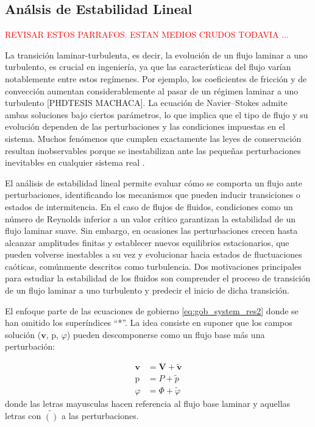 \subsection{Análsis de Estabilidad Lineal}

\textcolor{red}{REVISAR ESTOS PARRAFOS. ESTAN MEDIOS CRUDOS TODAVIA ...}

La transición laminar-turbulenta, es decir, la evolución de un flujo laminar a uno turbulento, es crucial en ingeniería, ya que las características del flujo varían notablemente entre estos regímenes. Por ejemplo, los coeficientes de fricción y de convección aumentan considerablemente al pasar de un régimen laminar a uno turbulento [PHDTESIS MACHACA]. La ecuación de Navier–Stokes admite ambas soluciones bajo ciertos parámetros, lo que implica que el tipo de flujo y su evolución dependen de las perturbaciones y las condiciones impuestas en el sistema. Muchos fenómenos que cumplen exactamente las leyes de conservación resultan inobservables porque se inestabilizan ante las pequeñas perturbaciones inevitables en cualquier sistema real \cite{kundu}.

El análisis de estabilidad lineal permite evaluar cómo se comporta un flujo ante perturbaciones, identificando los mecanismos que pueden inducir transiciones o estados de intermitencia. En el caso de flujos de fluidos, condiciones como un número de Reynolds inferior a un valor crítico garantizan la estabilidad de un flujo laminar suave. Sin embargo, en ocasiones las perturbaciones crecen hasta alcanzar amplitudes finitas y establecer nuevos equilibrios estacionarios, que pueden volverse inestables a su vez y evolucionar hacia estados de fluctuaciones caóticas, comúnmente descritos como turbulencia. Dos motivaciones principales para estudiar la estabilidad de los fluidos son comprender el proceso de transición de un flujo laminar a uno turbulento y predecir el inicio de dicha transición.

El enfoque parte de las ecuaciones de gobierno \ref{eq:gob_system_res2} donde se han omitido los superíndices ``*''. La idea consiste en suponer que los campos solución ($\mathbf{v}$, $\text{p}$, $\varphi$) pueden descomponerse como un flujo base más una perturbación:

\begin{align}
\mathbf{v} &= \mathbf{V} + \widetilde{\mathbf{v}} \\
\text{p} &= P + \widetilde{p} \\
\varphi &= \Phi + \widetilde{\varphi}
\end{align}  
donde las letras mayusculas hacen referencia al flujo base laminar y aquellas letras con $\widetilde{()}$ a las perturbaciones. %

